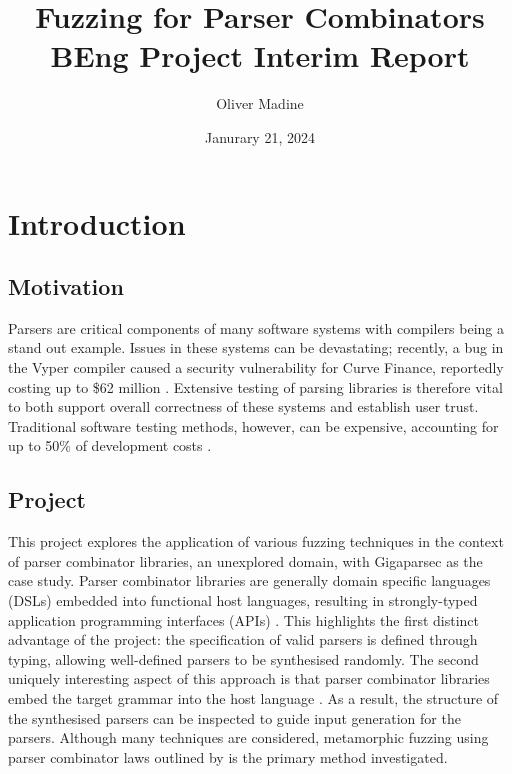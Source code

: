 \documentclass{article}
\title{Fuzzing for Parser Combinators \\ {\large BEng Project Interim Report}}
\author{Oliver Madine}
\date{Janurary 21, 2024}
\let\oldciteauthor\citeauthor
\renewcommand{\citeauthor}[1]{\oldciteauthor{#1} \cite{#1}}
\begin{document}
\maketitle


\section{Introduction} %

\subsection{Motivation}
Parsers are critical components of many software systems with compilers being a stand out example. Issues in these systems can be devastating; recently, a bug in the Vyper compiler caused a security vulnerability for Curve Finance, reportedly costing up to \$62 million \cite{curve}. Extensive testing of parsing libraries is therefore vital to both support overall correctness of these systems and establish user trust. Traditional software testing methods, however, can be expensive, accounting for up to 50\% of development costs \cite{quickcheck}.

\subsection{Project}
This project explores the application of various fuzzing techniques in the context of parser combinator libraries, an unexplored domain, with Gigaparsec \cite{gigaparsec} as the case study. Parser combinator libraries are generally domain specific languages (DSLs) embedded into functional host languages, resulting in strongly-typed application programming interfaces (APIs) \cite{monadic-combinators, parsec}. This highlights the first distinct advantage of the project: the specification of valid parsers is defined through typing, allowing well-defined parsers to be synthesised randomly. The second uniquely interesting aspect of this approach is that parser combinator libraries embed the target grammar into the host language \cite{combinator-parsing}. As a result, the structure of the synthesised parsers can be inspected to guide input generation for the parsers. Although many techniques are considered, metamorphic fuzzing using parser combinator laws outlined by \citeauthor{staged-selective} is the primary method investigated.
\end{document}
